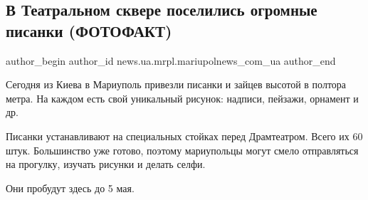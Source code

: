  
 
 
 
 
 
\subsection{В Театральном сквере поселились огромные писанки (ФОТОФАКТ)}
\label{sec:26_04_2019.stz.news.ua.mrpl.mariupolnews_com_ua.1.v_teatralnom_skvere_poselilis_pysanki}
 
\ifcmt
 author_begin
   author_id news.ua.mrpl.mariupolnews_com_ua
 author_end
\fi

Сегодня из Киева в Мариуполь привезли писанки и зайцев высотой в полтора метра.
На каждом есть свой уникальный рисунок: надписи, пейзажи, орнамент и др.

Писанки устанавливают на специальных стойках перед Драмтеатром. Всего их 60
штук. Большинство уже готово, поэтому мариупольцы могут смело отправляться на
прогулку, изучать рисунки и делать селфи.

Они пробудут здесь до 5 мая.

